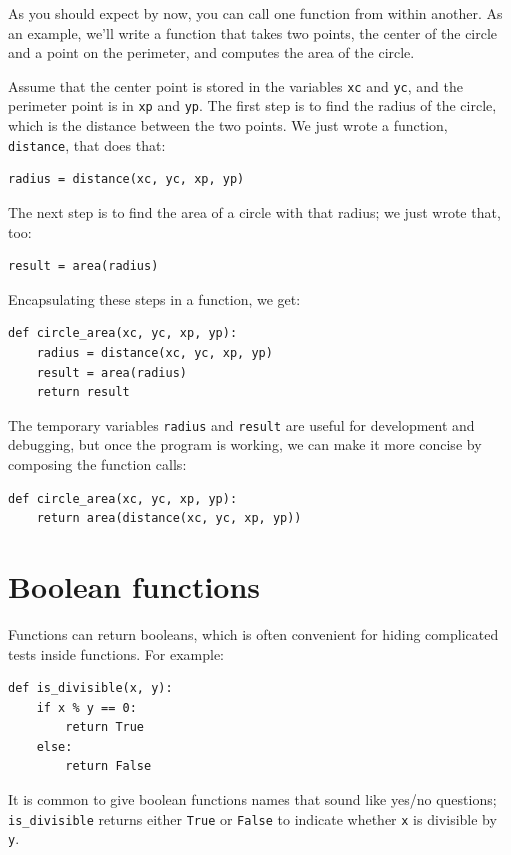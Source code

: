 \documentclass[10pt]{book}
\begin{document}
As you should expect by now, you can call one function from within
another.  As an example, we'll write a function that takes two points,
the center of the circle and a point on the perimeter, and computes
the area of the circle.

Assume that the center point is stored in the variables {\tt xc} and
{\tt yc}, and the perimeter point is in {\tt xp} and {\tt yp}. The
first step is to find the radius of the circle, which is the distance
between the two points.  We just wrote a function, {\tt
distance}, that does that:

\begin{verbatim}
radius = distance(xc, yc, xp, yp)
\end{verbatim}
%
The next step is to find the area of a circle with that radius;
we just wrote that, too:

\begin{verbatim}
result = area(radius)
\end{verbatim}
%
Encapsulating these steps in a function, we get:

\begin{verbatim}
def circle_area(xc, yc, xp, yp):
    radius = distance(xc, yc, xp, yp)
    result = area(radius)
    return result
\end{verbatim}
%
The temporary variables {\tt radius} and {\tt result} are useful for
development and debugging, but once the program is working, we can
make it more concise by composing the function calls:

\begin{verbatim}
def circle_area(xc, yc, xp, yp):
    return area(distance(xc, yc, xp, yp))
\end{verbatim}
%

\section{Boolean functions}
\label{boolean}

Functions can return booleans, which is often convenient for hiding
complicated tests inside functions.  
For example:

\begin{verbatim}
def is_divisible(x, y):
    if x % y == 0:
        return True
    else:
        return False
\end{verbatim}
%
It is common to give boolean functions names that sound like yes/no
questions; \verb"is_divisible" returns either {\tt True} or {\tt False}
to indicate whether {\tt x} is divisible by {\tt y}.
\end{document}
